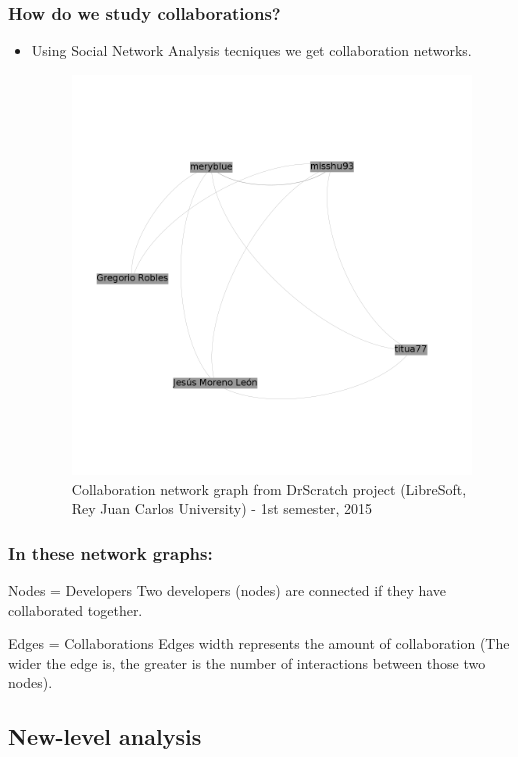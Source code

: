 \documentclass{beamer}
\begin{document}
\begin{frame}
\frametitle{How do we study collaborations?}
\begin{itemize}
\item Using Social Network Analysis tecniques we get collaboration networks.
\begin{figure}
\includegraphics[width=0.7\linewidth]{example-graph1.png}
\caption{Collaboration network graph from DrScratch project 
(LibreSoft, Rey Juan Carlos University) - 1st semester, 2015}
\end{figure}
\end{itemize}
\end{frame}


\begin{frame}
\frametitle{In these network graphs:}
\begin{block}{Nodes = Developers}
Two developers (nodes) are connected if they have collaborated together.
\end{block}

\begin{block}{Edges = Collaborations}
Edges width represents the amount of collaboration
(The wider the edge is, the greater is the number of interactions between those two nodes).
\end{block}

\end{frame}


\subsection{New-level analysis} %
\end{document}
